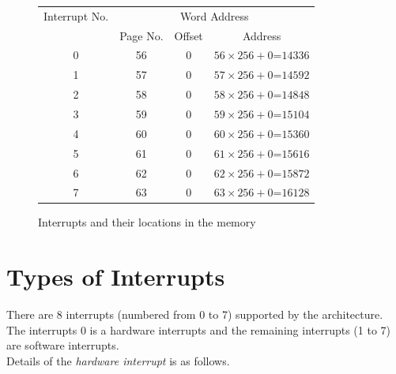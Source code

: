 \begin{figure}[htp!]
	\centering
	\renewcommand{\arraystretch}{1.2}
	\begin{tabular}{cccc}
		\toprule
		Interrupt No. & \multicolumn{3}{c}{Word Address} \\ \cline{2-4}
		& Page No. & Offset & Address \\ \midrule
		0 & 56       & 0      & $56\times256+0$=$14336$ \\
		1 & 57       & 0      & $57\times256+0$=$14592$ \\
		2 & 58       & 0      & $58\times256+0$=$14848$ \\
		3 & 59       & 0      & $59\times256+0$=$15104$ \\
		4 & 60       & 0      & $60\times256+0$=$15360$ \\
		5 & 61       & 0      & $61\times256+0$=$15616$ \\
		6 & 62       & 0      & $62\times256+0$=$15872$ \\
		7 & 63       & 0      & $63\times256+0$=$16128$ \\
		\bottomrule
	\end{tabular}
	\caption{Interrupts and their locations in the memory}
	\label{interrupt table}
\end{figure}


\section{Types of Interrupts}
There are 8 interrupts (numbered from 0 to 7) supported by the {\ESIM} architecture. The interrupts 0 is a hardware interrupts and the remaining interrupts (1 to 7) are software interrupts.\\

Details of the \emph{hardware interrupt} is as follows.

